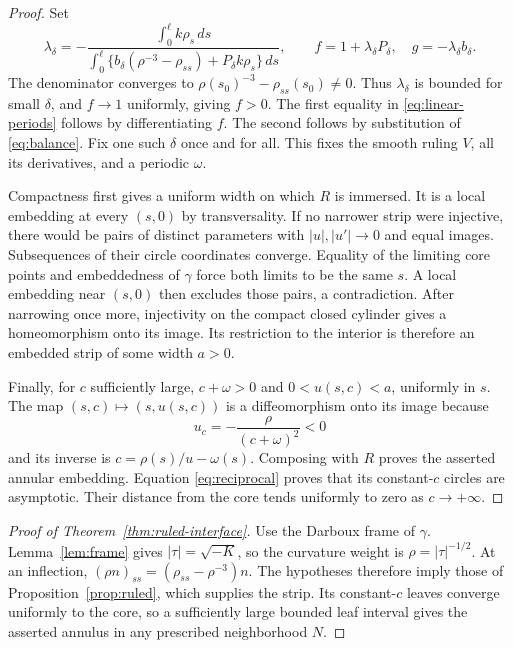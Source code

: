 \documentclass[11pt]{amsart}
\theoremstyle{definition}
\begin{document}
\begin{proof}
Set
\begin{equation}\label{eq:balance}
 \lambda_\delta=
 -\frac{\int_0^\ell k\rho_s\,ds}
 {\int_0^\ell\{b_\delta(\rho^{-3}-\rho_{ss})
                         +P_\delta k\rho_s\}\,ds},
 \qquad
 f=1+\lambda_\delta P_\delta,\quad g=-\lambda_\delta b_\delta .
\end{equation}
The denominator converges to
$\rho(s_0)^{-3}-\rho_{ss}(s_0)\ne0$.
Thus $\lambda_\delta$ is bounded for small $\delta$, and
$f\to1$ uniformly, giving $f>0$. The first equality in
\eqref{eq:linear-periods} follows by differentiating $f$.
The second follows by substitution of \eqref{eq:balance}.
Fix one such $\delta$ once and for all. This fixes the smooth
ruling $V$, all its derivatives, and a periodic $\omega$.

Compactness first gives a uniform width on
which $R$ is immersed. It is a local embedding at every $(s,0)$
by transversality. If no narrower strip were injective, there would
be pairs of distinct parameters with $|u|,|u'|\to0$ and equal
images. Subsequences of their circle coordinates converge.
Equality of the limiting core points and embeddedness of $\gamma$
force both limits to be the same $s$. A local embedding near
$(s,0)$ then excludes those pairs, a contradiction.
After narrowing once more, injectivity on the compact closed
cylinder gives a homeomorphism onto its image. Its restriction
to the interior is therefore an embedded strip of some width $a>0$.

Finally, for $c$ sufficiently large, $c+\omega>0$ and
$0<u(s,c)<a$, uniformly in $s$. The map
$(s,c)\mapsto(s,u(s,c))$ is a diffeomorphism onto its image because
\[
 u_c=-\frac{\rho}{(c+\omega)^2}<0
\]
and its inverse is $c=\rho(s)/u-\omega(s)$.
Composing with $R$ proves the asserted annular embedding.
Equation \eqref{eq:reciprocal} proves that its constant-$c$ circles
are asymptotic. Their distance from the core tends uniformly to
zero as $c\to+\infty$.
\end{proof}

\begin{proof}[Proof of Theorem~\ref{thm:ruled-interface}]
Use the Darboux frame of $\gamma$. Lemma~\ref{lem:frame} gives
$|\tau|=\sqrt{-K}$, so the curvature weight is
$\rho=|\tau|^{-1/2}$. At an inflection,
$(\rho n)_{ss}=(\rho_{ss}-\rho^{-3})n$.
The hypotheses therefore imply those of Proposition~\ref{prop:ruled},
which supplies the strip. Its constant-$c$ leaves converge uniformly
to the core, so a sufficiently large bounded leaf interval gives
the asserted annulus in any prescribed neighborhood $N$.
\end{proof}
\end{document}
